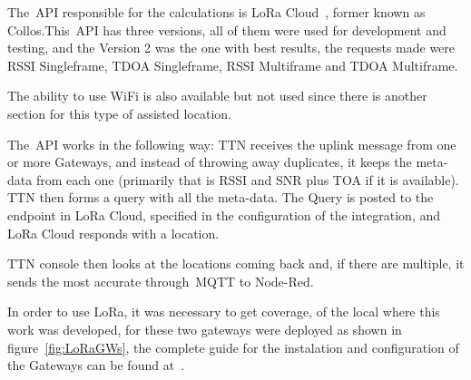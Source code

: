 The~\gls{API} responsible for the calculations is LoRa Cloud~\cite{LoRACloud}, former known as Collos.This~\gls{API} has three versions, all of them were used for development and testing, and the Version 2 was the one with best results, the requests made were RSSI Singleframe, TDOA Singleframe, RSSI Multiframe and TDOA Multiframe. 

The ability to use WiFi is also available but not used since there is another section for this type of assisted location. 

The~\gls{API} works in the following way: TTN receives the uplink message from one or more Gateways, and instead of throwing away duplicates, it keeps the meta-data from each one (primarily that is RSSI and SNR plus TOA if it is available).
TTN then forms a query with all the meta-data. The Query is posted to the endpoint in LoRa Cloud, specified in the configuration of the integration, and LoRa Cloud responds with a location.

TTN console then looks at the locations coming back and, if there are multiple, it sends the most accurate through~\gls{MQTT} to Node-Red.

In order to use LoRa, it was necessary to get coverage, of the local where this work was developed, for these two gateways were deployed as shown in figure~\ref{fig:LoRaGWs}, the complete guide for the instalation and configuration of the Gateways can be found at~\cite{githubnodered}.



